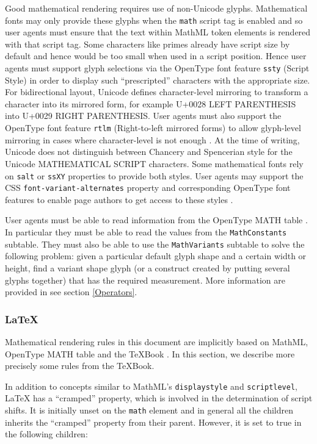 Good mathematical rendering requires use of non-Unicode glyphs. Mathematical
fonts may only provide these glyphs when the {\tt math}
script tag is enabled and so user agents must ensure that the text within
MathML token elements is rendered with that script tag. Some characters like
primes already have script size by default and hence would be too small when
used in a script position.
Hence user agents must support glyph selections via the OpenType font feature
{\tt ssty} (Script Style) in order to display such
``prescripted'' characters with the appropriate size.
For bidirectional layout, Unicode defines character-level mirroring
to transform a character into its mirrored form,
for example U+0028 LEFT PARENTHESIS into U+0029 RIGHT PARENTHESIS.
User agents must also support the OpenType font feature
{\tt rtlm} (Right-to-left mirrored forms)
to allow glyph-level mirroring in cases where character-level is not enough
\cite{OpenFontFormat3}.
At the time of writing, Unicode does not distinguish between Chancery and
Spencerian style for the Unicode MATHEMATICAL SCRIPT characters. Some
mathematical fonts rely on {\tt salt} or {\tt ssXY} properties to provide
both styles. User agents may support the CSS {\tt font-variant-alternates}
property and corresponding OpenType font features to enable page authors
to get access to these styles \cite{CSS3Font} \cite{OpenFontFormat3}.

User agents must be able to read information from the
OpenType MATH table \cite{OpenFontFormat3}.
In particular they must be able to read the values from the
{\tt MathConstants} subtable.
They must also be able to use the {\tt MathVariants} subtable
to solve the following problem: given a particular default glyph shape and a
certain width or height, find a variant shape glyph (or a construct created by
putting several glyphs together) that has the required measurement.
More information are provided in see section \ref{Operators}.

\subsubsection{LaTeX}\label{LaTeX}

Mathematical rendering rules in this document are implicitly based on
MathML, OpenType MATH table and the TeXBook
\cite{MathML3} \cite{OpenFontFormat3} \cite{TeXBook}. In this section, we
describe more precisely some rules from the TeXBook.

In addition to concepts similar to MathML's {\tt displaystyle} and
{\tt scriptlevel}, LaTeX has
a ``cramped'' property, which is involved in the determination of script shifts.
It is initially unset on the {\tt math} element and in general
all the children inherits the ``cramped'' property from their parent.
However, it is set to true in the following children:

